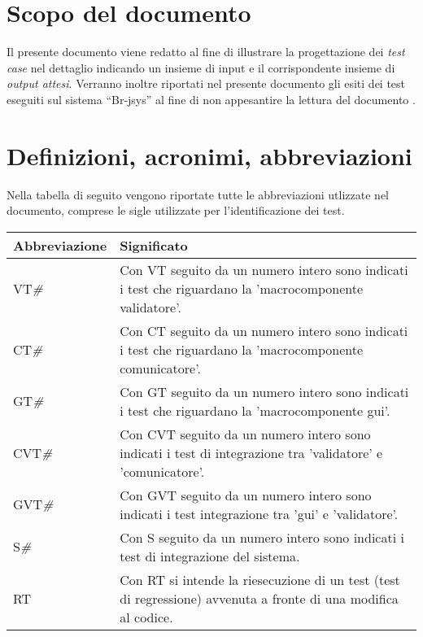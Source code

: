 \section{Scopo del documento}
Il presente documento viene redatto al fine di illustrare la progettazione dei \textit{test case} nel dettaglio indicando un insieme di input e il corrispondente insieme di \textit{output attesi}. Verranno inoltre riportati nel presente documento gli esiti dei test eseguiti sul sistema ``Br-jsys'' al fine di non appesantire la lettura del documento \PdQ .

\section{Definizioni, acronimi, abbreviazioni}
Nella tabella di seguito vengono riportate tutte le abbreviazioni utlizzate nel documento, comprese le sigle utilizzate per l'identificazione dei test.
\begin{center}
\begin{tabular}{||p{3.0cm}||p{8.5cm}||} \hline
\textbf{Abbreviazione} & \textbf{Significato} \\ \hline

VT\textit{\#} & Con VT seguito da un numero intero sono indicati i test che riguardano la 'macrocomponente validatore'.\\ \hline
CT\textit{\#} & Con CT seguito da un numero intero sono indicati i test che riguardano la 'macrocomponente comunicatore'.\\ \hline
GT\textit{\#} & Con GT seguito da un numero intero sono indicati i test che riguardano la 'macrocomponente gui'.\\ \hline
CVT\textit{\#} & Con CVT seguito da un numero intero sono indicati i test di integrazione tra 'validatore' e 'comunicatore'.\\ \hline
GVT\textit{\#} & Con GVT seguito da un numero intero sono indicati i test integrazione tra 'gui' e 'validatore'.\\ \hline
S\textit{\#} & Con S seguito da un numero intero sono indicati i test di integrazione del sistema.\\ \hline
RT\textit{} & Con RT si intende la riesecuzione di un test (test di regressione) avvenuta a fronte di una modifica al codice.\\ \hline

\end{tabular} \\
\end{center}

